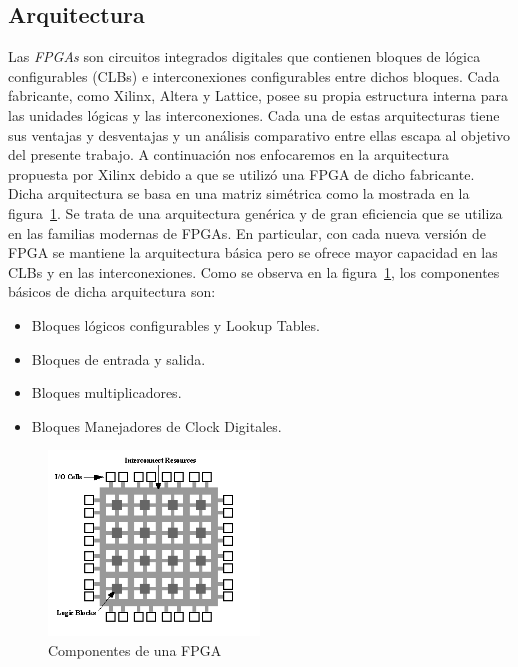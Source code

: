 \subsection{Arquitectura}

Las \textit{FPGAs} son circuitos integrados digitales que contienen
bloques de lógica configurables (CLBs) e interconexiones configurables
entre dichos bloques. Cada fabricante, como Xilinx, Altera y Lattice,
posee su propia estructura interna para las unidades lógicas y las
interconexiones. Cada una de estas arquitecturas tiene sus ventajas y
desventajas y un análisis comparativo entre ellas escapa al objetivo
del presente trabajo. A continuación nos enfocaremos en la
arquitectura propuesta por Xilinx debido a que se utilizó una FPGA de
dicho fabricante. Dicha arquitectura se basa en una matriz simétrica
como la mostrada en la figura~\ref{fig:compfpga}. Se trata de una
arquitectura genérica y de gran eficiencia que se utiliza
en las familias modernas de FPGAs. En particular, con cada nueva
versión de FPGA se mantiene la arquitectura básica pero se ofrece
mayor capacidad en las CLBs y en las interconexiones. Como se observa
en la figura~\ref{fig:compfpga}, los componentes básicos de dicha
arquitectura son:

\begin {itemize}
\item  Bloques lógicos configurables y Lookup Tables.
\item  Bloques de entrada y salida.
\item  Bloques multiplicadores.
\item  Bloques Manejadores de Clock Digitales.
\end {itemize}

\begin{figure}[h!]
\begin{center}
\includegraphics[width=0.5\textwidth,keepaspectratio=true]{./images/fpga1a}
\caption{Componentes de una FPGA}
\label{fig:compfpga}
\end{center}
\end{figure}

